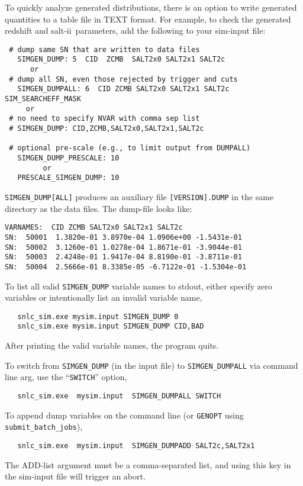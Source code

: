 \documentclass[12pt]{article}
\newcommand{\SALTII}{{\sc salt-ii}}
\begin{document}
To quickly analyze generated distributions,
there is an option to write generated quantities to
a table file in TEXT format.
For example, to check the generated redshift
and \SALTII\ parameters,
add the following to your sim-input file:
%
\begin{verbatim} 
 # dump same SN that are written to data files
   SIMGEN_DUMP: 5  CID  ZCMB  SALT2x0 SALT2x1 SALT2c
      or
 # dump all SN, even those rejected by trigger and cuts
   SIMGEN_DUMPALL: 6  CID ZCMB SALT2x0 SALT2x1 SALT2c SIM_SEARCHEFF_MASK
     or
 # no need to specify NVAR with comma sep list 
 # SIMGEN_DUMP: CID,ZCMB,SALT2x0,SALT2x1,SALT2c
 
 # optional pre-scale (e.g., to limit output from DUMPALL)
   SIMGEN_DUMP_PRESCALE: 10  
         or
   PRESCALE_SIMGEN_DUMP: 10
\end{verbatim}
%
{\tt SIMGEN\_DUMP[ALL]} produces an auxiliary file {\tt [VERSION].DUMP}
in the same directory as the data files.
The dump-file looks like:
%
\begin{Verbatim}[frame=single]
VARNAMES:  CID ZCMB SALT2x0 SALT2x1 SALT2c
SN:  50001  1.3820e-01 3.8970e-04 1.0906e+00 -1.5431e-01
SN:  50002  3.1260e-01 1.0278e-04 1.8671e-01 -3.9044e-01
SN:  50003  2.4248e-01 1.9417e-04 8.8190e-01 -3.8711e-01
SN:  50004  2.5666e-01 8.3385e-05 -6.7122e-01 -1.5304e-01
\end{Verbatim}
%
To list all valid {\tt SIMGEN\_DUMP} variable names to stdout, 
either specify zero variables or 
intentionally list an invalid variable name,
%
\begin{verbatim}
   snlc_sim.exe mysim.input SIMGEN_DUMP 0
   snlc_sim.exe mysim.input SIMGEN_DUMP CID,BAD
\end{verbatim}
%
After printing the valid variable names, the program quits.

To switch  from {\tt SIMGEN\_DUMP} (in the input file) 
to {\tt SIMGEN\_DUMPALL} via command line arg, use the 
``{\tt SWITCH}'' option,
\begin{verbatim}
   snlc_sim.exe  mysim.input  SIMGEN_DUMPALL SWITCH
\end{verbatim}


\bigskip
To append dump variables on the command line 
(or {\tt GENOPT} using {\tt submit\_batch\_jobs}),
\begin{verbatim}                                                                    
   snlc_sim.exe  mysim.input  SIMGEN_DUMPADD SALT2c,SALT2x1  
\end{verbatim}
%
The ADD-list argument must be a comma-separated list,
and using this key in the sim-input file will trigger an abort.
\end{document}
